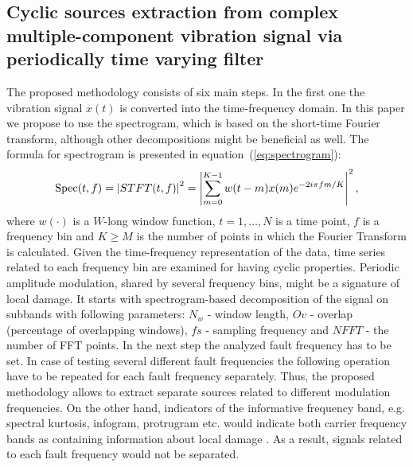 \subsection{Cyclic sources extraction from complex multiple-component vibration signal via periodically time varying filter}
\label{sec:semi_blind_methodology}
The proposed methodology consists of six main steps. In the first one the vibration signal $x(t)$ is converted into the time-frequency domain. In this paper we propose to use the spectrogram, which is based on the short-time Fourier transform, although other decompositions might be beneficial as well. The formula for spectrogram is presented in equation~(\ref{eq:spectrogram}): 
\begin{equation}
\label{eq:spectrogram}
\begin{gathered}
\operatorname{Spec}(t,f)=\left|STFT(t,f)\right|^2
=\left|\sum_{m=0}^{K-1}w(t-m)x(m)e^{-2i\pi fm/K}\right|^2,
\end{gathered}
\end{equation}
where $w(\cdot)$ is a $W$-long window function, $t=1,\ldots,N$ is a time point, $f$ is a frequency bin and $K\geq M$ is the number of points in which the Fourier Transform is calculated. Given the time-frequency representation of the data, time series related to each frequency bin are examined for having cyclic properties. Periodic amplitude modulation, shared by several frequency bins, might be a signature of local damage.  It starts with spectrogram-based decomposition of the signal on subbands with following parameters:  $N_w$ - window length, $Ov$ - overlap (percentage of overlapping windows), $fs$ - sampling frequency and $NFFT$ - the number of FFT points. In the next step the analyzed fault frequency has to be set. In case of testing several different fault frequencies the following operation have to be repeated for each fault frequency separately. Thus, the proposed methodology allows to extract separate sources related to different modulation frequencies. On the other hand, indicators of the informative frequency band, e.g. spectral kurtosis, infogram, protrugram etc. would indicate both carrier frequency bands as containing information about local damage \cite{antoni2006spectral,barszcz2011novel,antoni2016infogram,obuchowski2014selection}. As a result, signals related to each fault frequency would not be separated.
